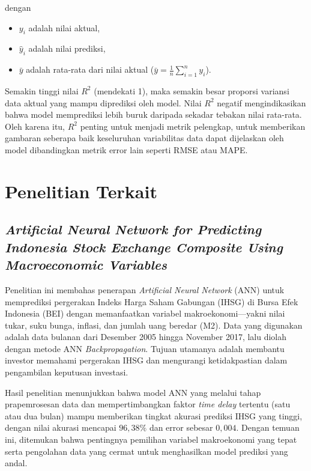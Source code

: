 \noindent
dengan
\begin{itemize}
    \item $y_i$ adalah nilai aktual,
    \item $\hat{y}_i$ adalah nilai prediksi,
    \item $\bar{y}$ adalah rata-rata dari nilai aktual (\( \bar{y} = \frac{1}{n}\sum_{i=1}^n y_i \)).
\end{itemize}

Semakin tinggi nilai $R^2$ (mendekati 1), maka semakin besar proporsi variansi data aktual yang mampu diprediksi oleh model. Nilai $R^2$ negatif mengindikasikan bahwa model memprediksi lebih buruk daripada sekadar tebakan nilai rata-rata. Oleh karena itu, $R^2$ penting untuk menjadi metrik pelengkap, untuk memberikan gambaran seberapa baik keseluruhan variabilitas data dapat dijelaskan oleh model dibandingkan metrik error lain seperti RMSE atau MAPE.


\section{Penelitian Terkait}

\subsection{\textit{Artificial Neural Network for Predicting Indonesia Stock Exchange Composite Using Macroeconomic Variables} \parencite{8528774}}


Penelitian ini membahas penerapan \textit{Artificial Neural Network} (ANN) untuk memprediksi pergerakan Indeks Harga Saham Gabungan (IHSG) di Bursa Efek Indonesia (BEI) dengan memanfaatkan variabel makroekonomi---yakni nilai tukar, suku bunga, inflasi, dan jumlah uang beredar (M2). Data yang digunakan adalah data bulanan dari Desember 2005 hingga November 2017, lalu diolah dengan metode ANN \textit{Backpropagation}. Tujuan utamanya adalah membantu investor memahami pergerakan IHSG dan mengurangi ketidakpastian dalam pengambilan keputusan investasi.

Hasil penelitian menunjukkan bahwa model ANN yang melalui tahap prapemrosesan data dan mempertimbangkan faktor \textit{time delay} tertentu (satu atau dua bulan) mampu memberikan tingkat akurasi prediksi IHSG yang tinggi, dengan nilai akurasi mencapai $96,38\%$ dan error sebesar $0,004$. Dengan temuan ini, ditemukan bahwa pentingnya pemilihan variabel makroekonomi yang tepat serta pengolahan data yang cermat untuk menghasilkan model prediksi yang andal. 

